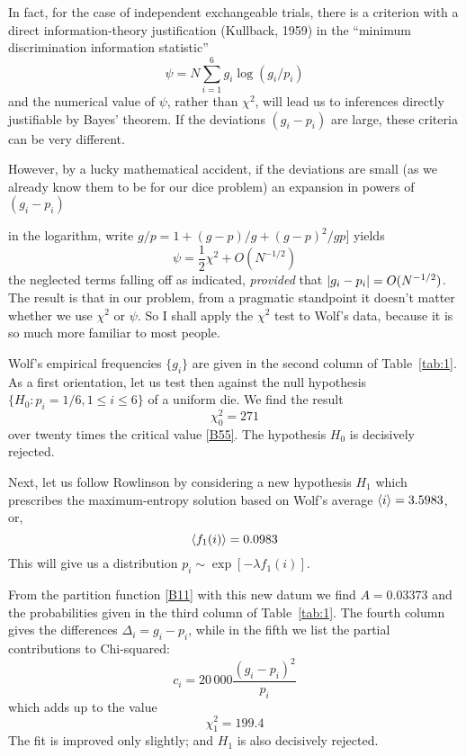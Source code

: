 In fact, for the case of independent exchangeable trials, there is a criterion with a direct information-theory justification (Kullback, \cite{kullback}{1959}) in the ``minimum discrimination information
statistic''
\begin{equation}
	\label{B56}
	\psi = N \sum_{i=1}^{6} g_i \log (g_i/p_i)
\end{equation}
and the numerical value of $\psi$, rather than $\chi^2$, will lead us to inferences directly justifiable by Bayes’ theorem.
If the deviations $(g_i-p_i)$ are large, these criteria can be very different.


However, by a lucky mathematical accident, if the deviations are small (as we already know them to be for our dice problem) an expansion in powers of $(g_i- p_i)$ {in the logarithm, write $g/p = 1+ (g-p)/g + (g-p)^2/gp]$ yields
\begin{equation}
	\label{B57}
	\psi = \frac{1}{2} \chi^2 + O\left(N^{-1/2}\right)
\end{equation}
the neglected terms falling off as indicated, \emph{provided} that $\lvert g_i - p_i\rvert = O(N^{-{1}/{2}})$.
The result is that in our problem, from a pragmatic standpoint it doesn't matter whether we use $\chi^2$ or $\psi$.
So I shall apply the $\chi^2$ test to Wolf's data, because it is so much more familiar to most people.

Wolf's empirical frequencies $\{g_i\}$ are given in the second column of Table~\ref{tab:1}.
As a first orientation, let us test then against the null hypothesis $\{H_0 : p_i = 1/6, 1\leq i\leq 6\}$ of a uniform die.
We find the result
\begin{equation}
	\label{B58}
	\chi_0^2 = 271
\end{equation}
over twenty times the critical value \eqref{B55}.
The hypothesis $H_0$ is decisively rejected.

Next, let us follow Rowlinson by considering a new hypothesis $H_1$ which prescribes the maximum-entropy solution based on Wolf's average $\langle i\rangle = 3.5983$, or,
\begin{equation}
	\label{B59}
	\langle f_1(i)\rangle = 0.0983
\end{equation}
This will give us a distribution $p_i \sim \exp[-\lambda f_1(i)]$.

From the partition function \eqref{B11} with this new datum we find $A = 0.03373$ and the probabilities given in the third column of Table~\ref{tab:1}.
The fourth column gives the differences $\Delta_i = g_i - p_i$, while in the fifth we list the partial contributions to Chi-squared:
\begin{equation*}
	c_i = 20\,000 \frac{(g_i - p_i)^2}{p_i}
\end{equation*}
which adds up to the value
\begin{equation}
	\label{B60}
	\chi^2_1 = 199.4
\end{equation}
The fit is improved only slightly; and $H_1$ is also decisively rejected.

}
